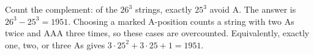 Count the complement: of the $26^3$ strings, exactly $25^3$ avoid A. The answer is $26^3-25^3=\boxed{1951}$. Choosing a marked A-position counts a string with two As twice and AAA three times, so these cases are overcounted. Equivalently, exactly one, two, or three As gives $3\cdot 25^2+3\cdot 25+1=1951$.
